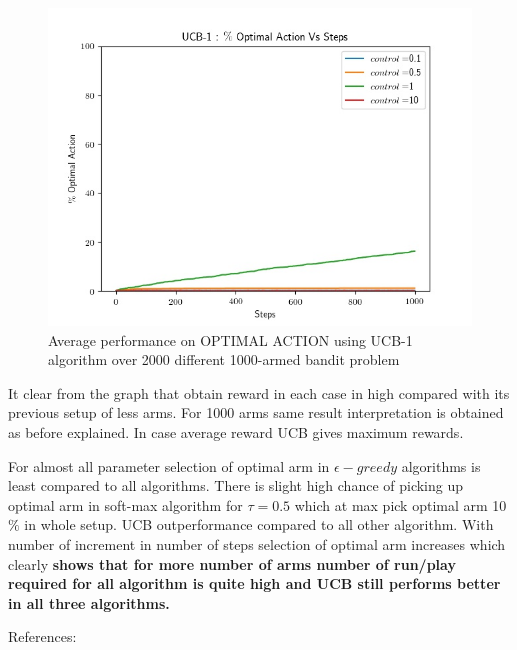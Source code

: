 \documentclass[preprint,12pt]{elsarticle}
\begin{document}
	
	\begin{figure}[H]
		\centering
		\includegraphics[scale=0.7]{./optimal_ucb_1000.jpg}
		\hspace{0.25cm}
		\caption{Average performance on OPTIMAL ACTION using UCB-1 algorithm over 2000 different 1000-armed bandit problem}
		\label{fig2:ucb_opt_1000}
	\end{figure}
	
	It clear from the graph that obtain reward in each case in high compared with its previous setup of less arms. For 1000 arms same result interpretation is obtained as before explained. In case average reward UCB gives maximum rewards. 
	
	For almost all parameter selection of optimal arm in $\epsilon - greedy $ algorithms is least compared to all algorithms. There is slight high chance of picking up optimal arm in soft-max algorithm for $\tau=0.5$ which at max pick optimal arm 10$\%$ in whole setup. UCB outperformance compared to all other algorithm. With number of increment in number of steps selection of optimal arm increases which clearly \textbf{shows that for more number of arms number of run/play required for all algorithm is quite high and UCB still performs better in all three algorithms.
}
				 
			\vspace{1cm}	
			References:
					
					
\end{document}
